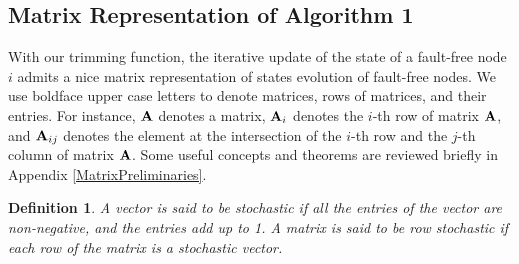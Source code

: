\documentclass[letterpaper, 11pt]{article}
\newtheorem{definition}{Definition}[section]
\begin{document}
\subsection{Matrix Representation of Algorithm 1}
\label{s_claim}

With our trimming function, the iterative update of the state
of a fault-free node $i$ admits a nice matrix representation of states evolution of fault-free nodes.  We use boldface upper case letters to denote matrices, rows of matrices, and their entries. For instance, $\bf{A}$ denotes a matrix, ${\bf A}_i$ denotes the $i$-th row of matrix $\bf{A}$, and ${\bf A}_{ij}$ denotes the element at the intersection of the $i$-th row and the $j$-th column of matrix $\bf{A}$. Some useful concepts and theorems are reviewed briefly in Appendix \ref{MatrixPreliminaries}.

\begin{definition}
\label{d_stochastic}
A vector is said to be {\em stochastic} if all the entries
of the vector are {\em non-negative}, and the entries add up to 1.
A matrix is said to be row stochastic if each row of the matrix is a
stochastic vector.
\end{definition}
\end{document}
